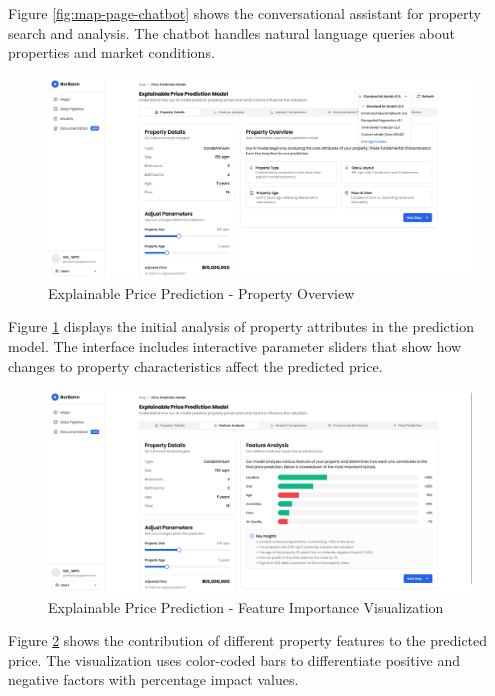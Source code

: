 Figure \ref{fig:map-page-chatbot} shows the conversational assistant for property search and analysis. The chatbot handles natural language queries about properties and market conditions.

\begin{figure}[h]
\centering
\includegraphics[width=1\textwidth]{assets/ui/explainable-property-detail.png}
\caption{Explainable Price Prediction - Property Overview}
\label{fig:explainable-property-detail}
\end{figure}

Figure \ref{fig:explainable-property-detail} displays the initial analysis of property attributes in the prediction model. The interface includes interactive parameter sliders that show how changes to property characteristics affect the predicted price.

\begin{figure}[h]
\centering
\includegraphics[width=1\textwidth]{assets/ui/explainable-feature-analysis.png}
\caption{Explainable Price Prediction - Feature Importance Visualization}
\label{fig:explainable-feature-analysis}
\end{figure}

Figure \ref{fig:explainable-feature-analysis} shows the contribution of different property features to the predicted price. The visualization uses color-coded bars to differentiate positive and negative factors with percentage impact values.

